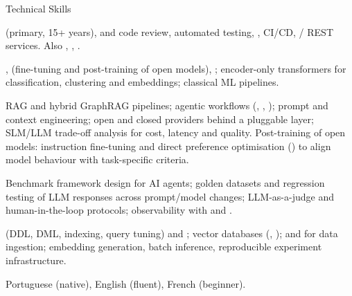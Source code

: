 \begin{rubric}{Technical Skills}

\entry*[Python \& SE]
   (primary, 15+ years),  and code review, automated testing,
  , CI/CD, / REST services. Also ,
  , .

\entry*[ML \& DL]
  ,  (fine-tuning and post-training of open models),
  ; encoder-only transformers for classification, clustering and embeddings;
  classical ML pipelines.

  RAG and hybrid GraphRAG pipelines; agentic workflows (, ,
  ); prompt and context engineering; open and closed providers behind a
  pluggable layer; SLM/LLM trade-off analysis for cost, latency and quality.
  Post-training of open models: instruction fine-tuning and direct preference optimisation
  () to align model behaviour with task-specific criteria.

\entry*[Evaluation]
  Benchmark framework design for AI agents; golden datasets and regression testing of LLM
  responses across prompt/model changes; LLM-as-a-judge and human-in-the-loop protocols;
  observability with  and .

   (DDL, DML, indexing, query tuning) and ; vector databases
  (, );  and  for data ingestion;
  embedding generation, batch inference, reproducible experiment infrastructure.

\entry*[Spoken]
  Portuguese (native), English (fluent), French (beginner).

\end{rubric}
